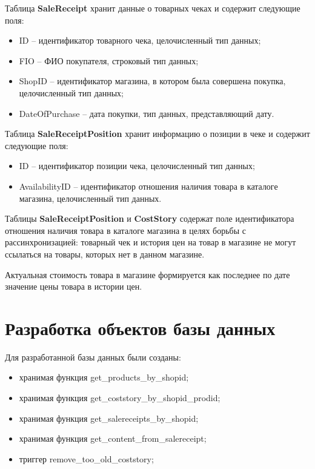 \documentclass[a4paper]{bmstu}
\begin{document}
Таблица \textbf{SaleReceipt} хранит данные о товарных чеках и содержит следующие поля:
\begin{itemize}
	\setlength\itemsep{0.01em}
	\item ID -- идентификатор товарного чека, целочисленный тип данных;
	\item FIO -- ФИО покупателя, строковый тип данных;
	\item ShopID -- идентификатор магазина, в котором была совершена покупка, целочисленный тип данных;
	\item DateOfPurchase -- дата покупки, тип данных, представляющий дату.
\end{itemize}


Таблица \textbf{SaleReceiptPosition} хранит информацию о позиции в чеке и содержит следующие поля:
\begin{itemize}
	\setlength\itemsep{0.01em}
	\item ID -- идентификатор позиции чека, целочисленный тип данных;
	\item AvailabilityID -- идентификатор отношения наличия товара в каталоге магазина, целочисленный тип данных.
\end{itemize}


Таблицы \textbf{SaleReceiptPosition} и \textbf{CostStory} содержат поле идентификатора отношения наличия товара в каталоге магазина в целях борьбы с рассинхронизацией: товарный чек и история цен на товар в магазине не могут ссылаться на товары, которых нет в данном магазине.

Актуальная стоимость товара в магазине формируется как последнее по дате значение цены товара в истории цен.

\section{Разработка объектов базы данных}

Для разработанной базы данных были созданы:

\begin{itemize}
	\item хранимая функция get\_products\_by\_shopid;
	\item хранимая функция get\_coststory\_by\_shopid\_prodid;
	\item хранимая функция get\_salereceipts\_by\_shopid;
	\item хранимая функция get\_content\_from\_salereceipt;
	\item триггер remove\_too\_old\_coststory;
\end{itemize}
\end{document}
